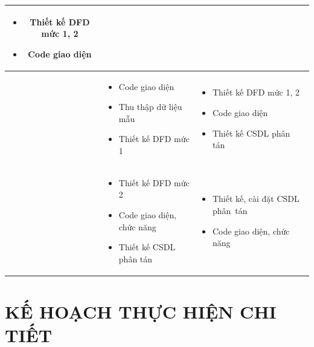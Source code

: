 \documentclass[a4paper,12pt]{report}
\begin{document}
\begin{center}
\begin{longtable}{|>{\centering\arraybackslash}c|
        >{\centering\arraybackslash}p{7cm}|
        >{\centering\arraybackslash}p{7cm}|}
        \begin{itemize}
            \item Thiết kế DFD mức 1, 2
            \item Code giao diện
        \end{itemize}                                 \\
        \hline
        6                                                     &
        \begin{itemize}
            \item Code giao diện
            \item Thu thập dữ liệu mẫu
            \item Thiết kế DFD mức 1
        \end{itemize}
                                                              &
        \begin{itemize}
            \item Thiết kế DFD mức 1, 2
            \item Code giao diện
            \item Thiết kế CSDL phân tán
        \end{itemize}                                \\
        \hline
        7                                                     &
        \begin{itemize}
            \item Thiết kế DFD mức 2
            \item Code giao diện, chức năng
            \item Thiết kế CSDL phân tán
        \end{itemize}
                                                              &
        \begin{itemize}
            \item Thiết kế, cài đặt CSDL phân~tán
            \item Code giao diện, chức năng
        \end{itemize}                       \\
        \hline
    \end{longtable}
\end{center}
\clearpage
\chapter*{\centering KẾ HOẠCH THỰC HIỆN CHI TIẾT}
\end{document}
